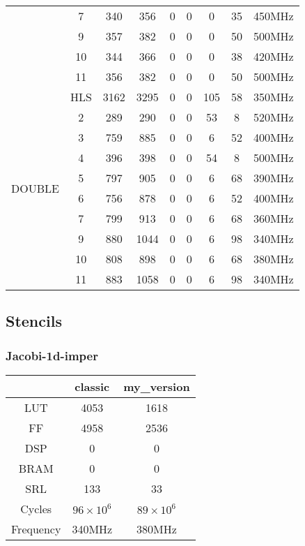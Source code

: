 \documentclass[10pt,a4paper,twoside]{article}
\begin{document}
\begin{tabular}{|c|c|c|c|c|c|c|c|c|}
	\cline{2-9}
	& 7 & 340 & 356 & 0 & 0 & 0 & 35 & 450MHz\\
	\cline{2-9}
	& 9 & 357 & 382 & 0 & 0 & 0 & 50 & 500MHz\\
	\cline{2-9}
	& 10 & 344 & 366 & 0 & 0 & 0 & 38 & 420MHz \\
	\cline{2-9}
	& 11 & 356 & 382 & 0 & 0 & 0 & 50 & 500MHz\\
	\hline
	\hline
	\multirow{11}{*}{DOUBLE} & HLS & 3162 & 3295 & 0 & 0 & 105 & 58 & 350MHz \\
	\cline{2-9}
	& 2 & 289 & 290 & 0 & 0 & 53 & 8 & 520MHz \\
	\cline{2-9}
	& 3 & 759 & 885 & 0 & 0 & 6 & 52 & 400MHz\\
	\cline{2-9}
	& 4 & 396 & 398 & 0 & 0 & 54 & 8 & 500MHz \\
	\cline{2-9}
	& 5 & 797 & 905 & 0 & 0 & 6 & 68 & 390MHz \\
	\cline{2-9}
	& 6 & 756 & 878 & 0 & 0 & 6 & 52 & 400MHz \\
	\cline{2-9}
	& 7 & 799 & 913 & 0 & 0 & 6 & 68 & 360MHz \\
	\cline{2-9}
	& 9 & 880 & 1044 & 0 & 0 & 6 & 98 & 340MHz \\
	\cline{2-9}
	& 10 & 808 & 898 & 0 & 0 & 6 & 68 & 380MHz \\
	\cline{2-9}
	& 11 & 883 & 1058 & 0 & 0 & 6 & 98 & 340MHz \\
	\hline
\end{tabular}

\subsection{Stencils}

\subsubsection{Jacobi-1d-imper}

\begin{tabular}{|c|c|c|}
	\hline
     & classic & my\_version \\
    \hline
    LUT & 4053 & 1618 \\
    \hline
    FF & 4958 & 2536 \\
    \hline
    DSP & 0 & 0  \\
    \hline
    BRAM & 0 & 0  \\
    \hline
    SRL & 133 & 33  \\
    \hline
    Cycles & $96 \times 10^6$ & $89 \times 10^6$ \\
    \hline
	Frequency & 340MHz & 380MHz\\
	\hline
\end{tabular}
\end{document}
